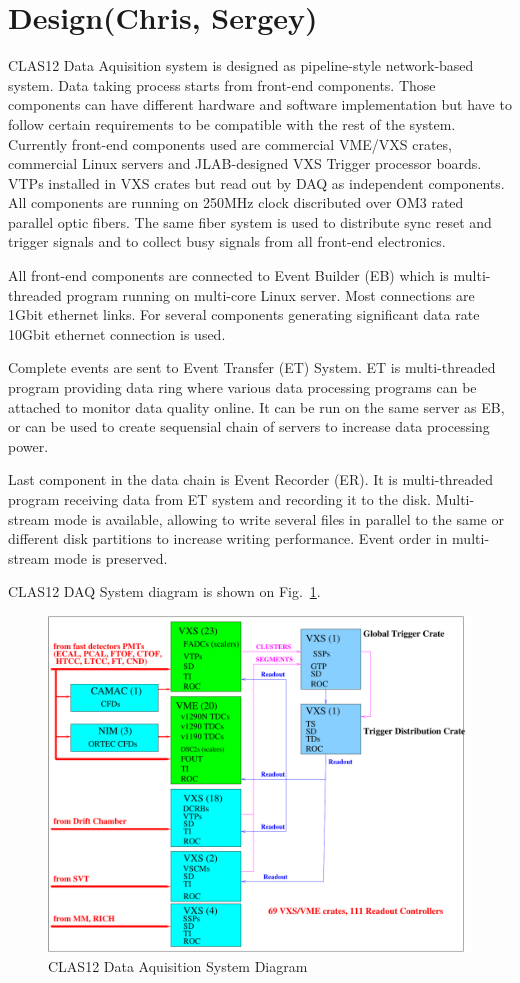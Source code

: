 \section{Design(Chris, Sergey)}

CLAS12 Data Aquisition system is designed as pipeline-style network-based system. Data taking process starts from front-end components. Those components can have different hardware and software implementation but have to follow certain requirements to be compatible with the rest of the system. Currently front-end components used are commercial VME/VXS crates, commercial Linux servers and JLAB-designed VXS Trigger processor boards. VTPs installed in VXS crates but read out by DAQ as independent components. All components are running on 250MHz clock discributed over OM3 rated parallel optic fibers. The same fiber system is used to distribute sync reset and trigger signals and to collect busy signals from all front-end electronics.

All front-end components are connected to Event Builder (EB) which is multi-threaded program running on multi-core Linux server. Most connections are 1Gbit ethernet links. For several components generating significant data rate 10Gbit ethernet connection is used.

Complete events are sent to Event Transfer (ET) System. ET is multi-threaded program providing data ring where various data processing programs can be attached to monitor data quality online. It can be run on the same server as EB, or can be used to create sequensial chain of servers to increase data processing power.

Last component in the data chain is Event Recorder (ER). It is multi-threaded program receiving data from ET system and recording it to the disk. Multi-stream mode is available, allowing to write several files in parallel to the same or different disk partitions to increase writing performance. Event order in multi-stream mode is preserved.

CLAS12 DAQ System diagram is shown on Fig.~\ref{fig:DAQdiagram}.

\begin{figure}[hbt]
	\centering
	\includegraphics[width=1.0\columnwidth,keepaspectratio]{img/CLAS12_HARDWARE_2.pdf}
	\caption{CLAS12 Data Aquisition System Diagram}
	\label{fig:DAQdiagram}
\end{figure}

